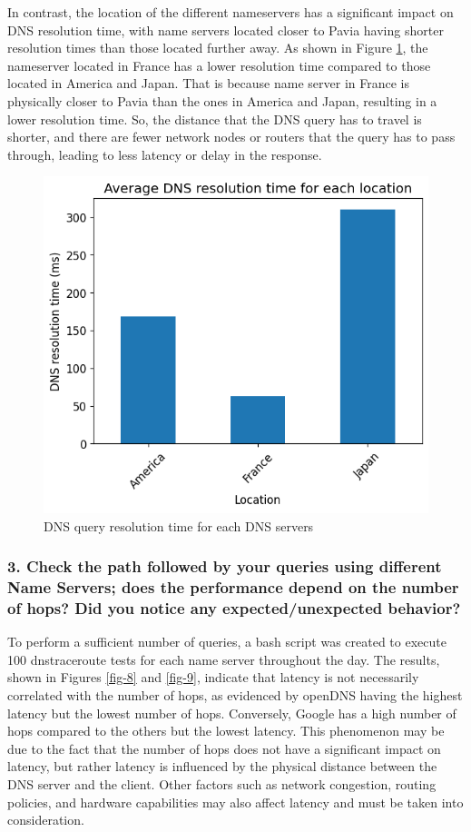 \documentclass[eng]{class}
\begin{document}
In contrast, the location of the different nameservers has a significant impact on DNS resolution time,
with name servers located closer to Pavia having shorter resolution times than those located further away.\newline
As shown in Figure \ref{fig-7}, the nameserver located in France has a lower resolution time compared to those located in America and Japan.
That is because name server in France is physically closer to Pavia than the ones in America and Japan, resulting in a lower resolution time.
So, the distance that the DNS query has to travel is shorter, and there are fewer network nodes or routers that the query has to pass through, leading to less latency or delay in the response.
\begin{figure}[H]
  \centering
  \includegraphics[width=.7\columnwidth]{images/avgLat2.2.loc.png}
  \caption{DNS query resolution time for each DNS servers}
  \label{fig-7}
\end{figure}
\subsubsection*{3. Check the path followed by your queries using different Name Servers; does the
  performance depend on the number of hops? Did you notice any
  expected/unexpected behavior?}

To perform a sufficient number of queries, a bash script was created to execute 100 dnstraceroute tests for each name server throughout the day.\newline
The results, shown in Figures \ref{fig-8} and \ref{fig-9}, indicate that latency is not necessarily correlated with the number of hops,
as evidenced by openDNS having the highest latency but the lowest number of hops.
Conversely, Google has a high number of hops compared to the others but the lowest latency.
This phenomenon may be due to the fact that the number of hops does not have a significant impact on latency,
but rather latency is influenced by the physical distance between the DNS server and the client.
Other factors such as network congestion, routing policies, and hardware capabilities may also affect latency and must be taken into consideration.
\end{document}
